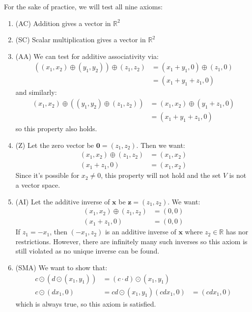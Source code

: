 \begin{sol}
For the sake of practice, we will test all nine axioms:
\begin{enumerate}
    \item (AC) Addition gives a vector in $\mathbb{R}^2$
    \item (SC) Scalar multiplication gives a vector in $\mathbb{R}^2$
    \item (AA) We can test for additive associativity via:
    \begin{align}
        \left((x_1,x_2) \oplus (y_1,y_2)\right) \oplus (z_1, z_2) &= (x_1+y_1, 0) \oplus (z_1, 0) \\ 
        &= (x_1+y_1+z_1, 0)
    \end{align}
    and similarly:
    \begin{align}
        (x_1,x_2) \oplus \left((y_1,y_2) \oplus (z_1,z_2) \right) &= (x_1,x_2) \oplus (y_1+z_1,0) \\ 
        &= (x_1+y_1+z_1,0)
    \end{align}
    so this property also holds.
    \item (Z) Let the zero vector be $\bm{0}=(z_1,z_2)$. Then we want:
    \begin{align}
        (x_1,x_2) \oplus (z_1,z_2) &= (x_1, x_2) \\
        (x_1+z_1, 0) &= (x_1, x_2)
    \end{align}
    Since it's possible for $x_2 \neq 0$, this property will not hold and the set $V$ is not a vector space.
    \item (AI) Let the additive inverse of $\bm{x}$ be $\bm{z}=(z_1,z_2)$. We want:
    \begin{align}
        (x_1,x_2) \oplus (z_1,z_2) &= (0,0) \\ 
        (x_1+z_1,0) &= (0,0) 
    \end{align}
    If $z_1=-x_1$, then $(-x_1, z_2)$ is an additive inverse of $\bm{x}$ where $z_2 \in \mathbb{R}$ has nor restrictions. However, there are infinitely many such inverses so this axiom is still violated as no unique inverse can be found.
    \item (SMA) We want to show that:
    \begin{align}
        c \odot \left(d \odot (x_1, y_1) \right) &= \left(c \cdot d \right) \odot (x_1,y_1) \\ 
        c \odot \left(dx_1, 0\right) &= cd \odot (x_1,y_1)  
        (cdx_1, 0) &= (cdx_1,0)
    \end{align}
    which is always true, so this axiom is satisfied.

\end{enumerate}
\end{sol}

